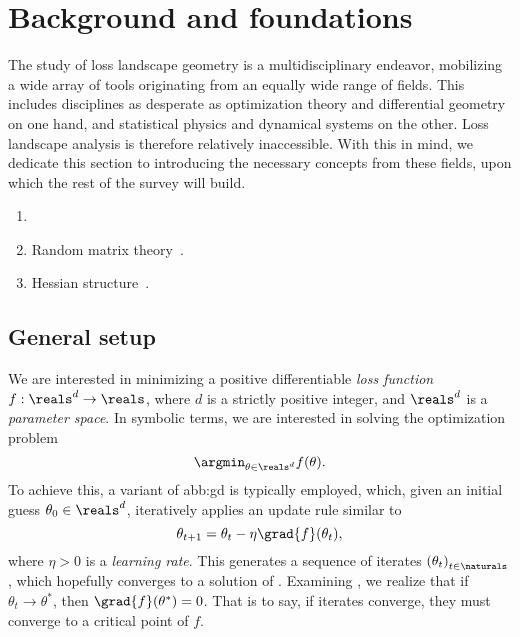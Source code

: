 \section{Background and foundations}\label{sec:background}

The study of loss landscape geometry is a multidisciplinary endeavor,
mobilizing a wide array of tools originating from an equally wide range of fields.
This includes disciplines as desperate as optimization theory and differential geometry on one hand,
and statistical physics and dynamical systems on the other.
Loss landscape analysis is therefore relatively inaccessible.
With this in mind, we dedicate this section to introducing the necessary concepts from these fields,
upon which the rest of the survey will build.
\begin{enumerate}
	\item \citet{zhaoSymmetriesFlatMinima2023}
	\item Random matrix theory~\cite{%
		      baskervilleRandomMatrixTheory2023,%
		      penningtonNonlinearRandomMatrix2017%
	      }.
	\item Hessian structure~\cite{%
		      wuDissectingHessianUnderstanding2022,%
		      dauphinNeglectedHessianComponent2024%
	      }.
\end{enumerate}

\subsection{General setup}\label{sub:background:setup}

We are interested in minimizing a positive differentiable \emph{loss function}
\(f:\reals^{d}\to\reals\), where \(d\) is a strictly positive integer,
and \(\reals^{d}\) is a \emph{parameter space}.
In symbolic terms, we are interested in solving the optimization problem
\begin{equation}\label{eq:learning-problem}
	\argmin_{\theta\in\reals^{d}} f(\theta).
\end{equation}
To achieve this, a variant of \gls{abb:gd} is typically employed,
which, given an initial guess \(\theta_{0}\in\reals^{d}\),
iteratively applies an update rule similar to
\begin{equation}\label{eq:gd}
	\theta_{t+1} = \theta_{t} - \eta \grad{f}(\theta_{t}),
\end{equation}
where \(\eta > 0\) is a \emph{learning rate}.
This generates a sequence of iterates \(\left( \theta_{t} \right)_{t\in\naturals}\),
which hopefully converges to a solution of .
Examining , we realize that if \(\theta_{t} \to \theta^{\ast}\),
then \(\grad{f}(\theta^{\ast}) = 0\).
That is to say, if iterates converge, they must converge to a critical point of \(f\).

